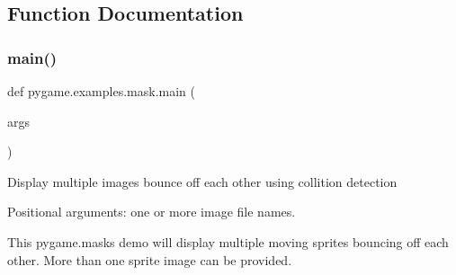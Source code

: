 \subsection{Function Documentation}
\mbox{\label{namespacepygame_1_1examples_1_1mask_a5a1d84d7d63138af459b6da9692a2cf9}} 
\subsubsection{\texorpdfstring{main()}{main()}}
{\footnotesize\ttfamily def pygame.\+examples.\+mask.\+main (\begin{DoxyParamCaption}\item[{}]{args }\end{DoxyParamCaption})}

\begin{DoxyVerb}Display multiple images bounce off each other using collition detection

Positional arguments:
  one or more image file names.

This pygame.masks demo will display multiple moving sprites bouncing
off each other. More than one sprite image can be provided.\end{DoxyVerb}
 